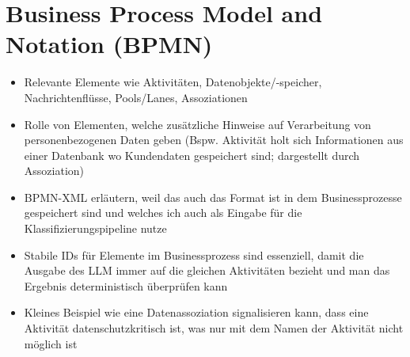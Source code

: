 \section{Business Process Model and Notation (BPMN)}\label{sec:bpmn}

\begin{itemize}
    \item Relevante Elemente wie Aktivitäten, Datenobjekte/-speicher, Nachrichtenflüsse, Pools/Lanes, Assoziationen
    \item Rolle von Elementen, welche zusätzliche Hinweise auf Verarbeitung von personenbezogenen Daten geben (Bspw. Aktivität holt sich Informationen aus einer Datenbank wo Kundendaten gespeichert sind; dargestellt durch Assoziation)
    \item BPMN-XML erläutern, weil das auch das Format ist in dem Businessprozesse gespeichert sind und welches ich auch als Eingabe für die Klassifizierungspipeline nutze
    \item Stabile IDs für Elemente im Businessprozess sind essenziell, damit die Ausgabe des LLM immer auf die gleichen Aktivitäten bezieht und man das Ergebnis deterministisch überprüfen kann
    \item Kleines Beispiel wie eine Datenassoziation signalisieren kann, dass eine Aktivität datenschutzkritisch ist, was nur mit dem Namen der Aktivität nicht möglich ist
\end{itemize}